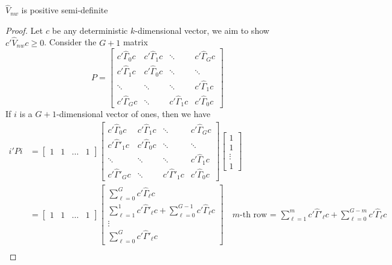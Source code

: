 \documentclass[DIV=14,titlepage=false]{scrreprt}
\begin{document}
\begin{theorem}
    $\hat V_{nw}$ is positive semi-definite
\end{theorem}
\begin{proof}
    Let $c$ be any deterministic $k$-dimensional vector, we aim to show $c'\hat V_{nw} c \geq 0$. Consider the $G+1$ matrix
\[
    P = 
    \begin{bmatrix}
        c'\hat\Gamma_0c &  c'\hat\Gamma_1c& \ddots & c'\hat\Gamma_Gc\\
        c'\hat\Gamma_1c &  c'\hat\Gamma_0c& \ddots & \ddots \\
        \ddots & \ddots & \ddots & c'\hat\Gamma_1c\\
        c'\hat\Gamma_Gc & \ddots &c'\hat\Gamma_1c & c'\hat\Gamma_0c
    \end{bmatrix}
\]   
If $i$ is a $G+1$-dimensional vector of ones, then we have
\begin{align*}
    i'Pi&= 
    \begin{bmatrix}
        1 & 1 & \dots&1
    \end{bmatrix}
    \begin{bmatrix}
        c'\hat\Gamma_0c &  c'\hat\Gamma_1c& \ddots & c'\hat\Gamma_Gc\\
        c'\hat\Gamma'_1c &  c'\hat\Gamma_0c& \ddots & \ddots \\
        \ddots & \ddots & \ddots & c'\hat\Gamma_1c\\
        c'\hat\Gamma'_Gc & \ddots &c'\hat\Gamma'_1c & c'\hat\Gamma_0c
    \end{bmatrix}
    \begin{bmatrix}
        1 \\
        1 \\
        \vdots\\
        1
    \end{bmatrix}\\
    &= \begin{bmatrix}
        1 & 1 & \dots&1
    \end{bmatrix}
    \begin{bmatrix}
        \sum_{{\ell}=0}^{G}c' \hat\Gamma_{\ell} c\\
        \sum_{{\ell}=1}^{1}c' \hat\Gamma'_{\ell} c+ \sum_{{\ell}=0}^{G-1}c' \hat\Gamma_{\ell} c\\
        \vdots\\
        \sum_{{\ell}=0}^{G}c' \hat\Gamma'_{\ell} c
    \end{bmatrix} \quad \text{$m$-th row = $\sum_{{\ell}=1}^{m}c' \hat\Gamma'_{\ell} c+ \sum_{{\ell}=0}^{G-m}c' \hat\Gamma_{\ell} c$}\\

\end{align*}
\end{proof}
\end{document}
